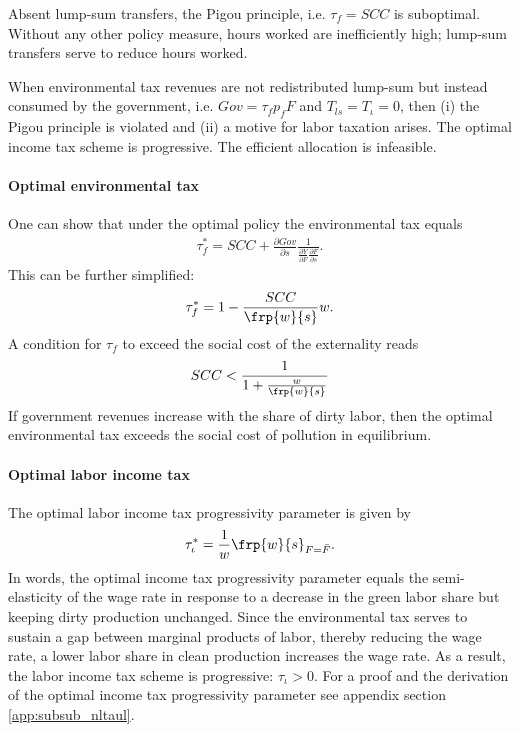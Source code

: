 \begin{prop}\label{prop:1}
Absent lump-sum transfers, the Pigou principle, i.e. $\tau_f=SCC$ is suboptimal. Without any other policy measure, hours worked are inefficiently high; lump-sum transfers serve to reduce hours worked.
\end{prop}


\begin{prop}\label{prop:2}
When environmental tax revenues are not redistributed lump-sum but instead consumed by the government, i.e. $Gov=\tau_fp_fF$ and $T_{ls}=T_\iota=0$, then (i) the Pigou principle is violated and (ii) a motive for labor taxation arises. The optimal income tax scheme is progressive. %
The efficient allocation is infeasible.  
\end{prop}

\paragraph{Optimal environmental tax}
One can show that under the optimal policy the environmental tax equals
	\begin{align}
\tau_{f}^*= SCC+\frac{\partial Gov}{\partial s}\frac{1}{\frac{\partial Y}{\partial F}\frac{\partial F}{\partial s}}.
\end{align}
This can be further simplified:
\begin{align}
\tau_f^* = 1-\frac{SCC}{\frp{w}{s}}w. 
\end{align}
A condition for $\tau_f$ to exceed the social cost of the externality reads
\begin{align}
SCC<\frac{1}{1+\frac{w}{\frp{w}{s}}}
\end{align}
If government revenues increase with the share of dirty labor, then the optimal environmental tax exceeds the social cost of pollution in equilibrium. 	

\paragraph{Optimal labor income tax}
The optimal labor income tax progressivity parameter is given by 
\begin{align}\label{eq:nls_taulopt}
\tau_\iota^*=\frac{1}{w}\frp{w}{s}_{F=\bar{F}}.
\end{align}
In words, the optimal income tax progressivity parameter equals the semi-elasticity of the wage rate in response to a decrease in the green labor share but keeping dirty production unchanged. 
Since the environmental tax serves to sustain a gap between marginal products of labor, thereby  reducing the wage rate, a lower labor share in clean production increases the wage rate. As a result, the labor income tax scheme is progressive: $\tau_\iota>0$. For a proof and the derivation of the optimal income tax progressivity parameter see appendix section \ref{app:subsub_nltaul}.

